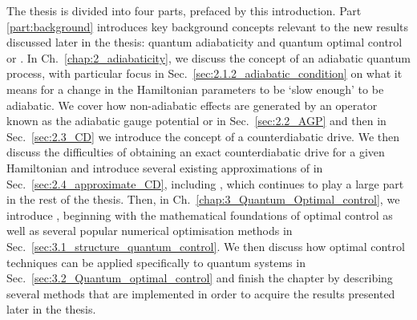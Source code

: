 The thesis is divided into four parts, prefaced by this introduction. Part \ref{part:background} introduces key background concepts relevant to the new results discussed later in the thesis: quantum adiabaticity and quantum optimal control or . In Ch.~\ref{chap:2_adiabaticity}, we discuss the concept of an adiabatic quantum process, with particular focus in Sec.~\ref{sec:2.1.2_adiabatic_condition} on what it means for a change in the Hamiltonian parameters to be `slow enough' to be adiabatic. We cover how non-adiabatic effects are generated by an operator known as the adiabatic gauge potential or  in Sec.~\ref{sec:2.2_AGP} and then in Sec.~\ref{sec:2.3_CD} we introduce the concept of a counterdiabatic drive. We then discuss the difficulties of obtaining an exact counterdiabatic drive for a given Hamiltonian and introduce several existing approximations of  in Sec.~\ref{sec:2.4_approximate_CD}, including , which continues to play a large part in the rest of the thesis. Then, in Ch.~\ref{chap:3_Quantum_Optimal_control}, we introduce , beginning with the mathematical foundations of optimal control as well as several popular numerical optimisation methods in Sec.~\ref{sec:3.1_structure_quantum_control}. We then discuss how optimal control techniques can be applied specifically to quantum systems in Sec.~\ref{sec:3.2_Quantum_optimal_control} and finish the chapter by describing several  methods that are implemented in order to acquire the results presented later in the thesis.

